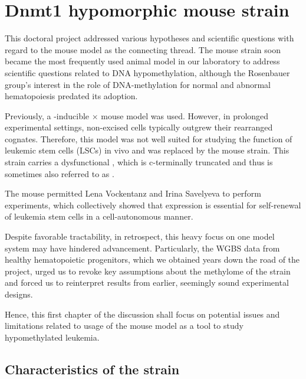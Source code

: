 \chapter{Dnmt1 hypomorphic mouse strain \dnmtchipheadline}
\label{chap:d:strain}
\minitoc

This doctoral project addressed various hypotheses and scientific questions with regard to the \dnmtchip mouse model as the connecting thread. The mouse strain soon became the most frequently used animal model in our laboratory to address scientific questions related to DNA hypomethylation, although the Rosenbauer group's interest in the role of DNA-methylation for normal and abnormal hematopoiesis predated its adoption\cite{Broeske2009,Vockentanz2010}.

Previously, a \polyic-inducible \mllafnine \cremx \ensuremath{\times} \dnmtfloxchip mouse model was used. However, in prolonged experimental settings, non-excised \dnmtfloxchip cells typically outgrew their rearranged cognates. Therefore, this model was not well suited for studying the function of leukemic stem cells (LSCs) in vivo and was replaced by the \dnmtchip mouse strain. This strain carries a dysfunctional \dnmtnegallele, which is c-terminally truncated and thus is sometimes also referred to as \dnmtcchip. 

The \dnmtchip mouse permitted Lena Vockentanz and Irina Savelyeva to perform experiments, which collectively showed that  expression is essential for self-renewal of \mllafnine leukemia stem cells in a cell-autonomous manner\cite{Vockentanz2011}. 

Despite favorable tractability, in retrospect, this heavy focus on one model system may have hindered advancement. Particularly, the WGBS data from healthy hematopoietic progenitors, which we obtained years down the road of the project, urged us to revoke key assumptions about the methylome of the \dnmtchip strain and forced us to reinterpret results from earlier, seemingly sound experimental designs. 

Hence, this first chapter of the discussion shall focus on potential issues and limitations related to usage of the \dnmtchip mouse model as a tool to study hypomethylated \mllafnine leukemia.   

\section{Characteristics of the \dnmtchipheadline strain}
\label{chap:d:strain:details}

